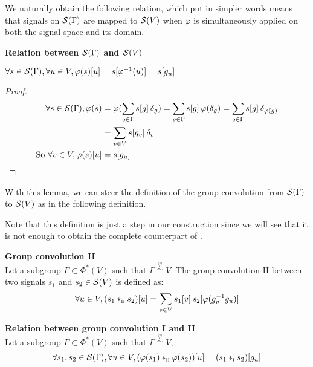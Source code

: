 We naturally obtain the following relation, which put in simpler words means that signals on $\cs(\Gamma)$ are mapped to $\cs(V)$ when $\varphi$ is simultaneously applied on both the signal space and its domain.

\begin{lemma}\textbf{Relation between $\cs(\Gamma)$ and $\cs(V)$}\\
\centerline{$\forall s \in \cs(\Gamma), \forall u \in V, \varphi(s)[u] = s[\varphi^{-1}(u)] = s[g_u]$}
\label{lem:outer}
\end{lemma}

\begin{proof}
\begin{align*}
\forall s \in \cs(\Gamma), \varphi(s) & = \varphi(\displaystyle \sum_{g \in \Gamma} s[g] \h{2} \delta_g)
 = \displaystyle \sum_{g \in \Gamma} s[g] \h{2} \varphi(\delta_g)
 = \displaystyle \sum_{g \in \Gamma} s[g] \h{2} \delta_{\varphi(g)}\\
 & = \displaystyle \sum_{v \in V} s[g_v] \h{2} \delta_v\\
 \text{So }\forall v \in V, \varphi(s) [u] & = s[g_u]
\end{align*}
\end{proof}

With this lemma, we can steer the definition of the group convolution from $\cs(\Gamma)$ to $\cs(V)$ as in the following definition.

\begin{remark}
Note that this definition is just a step in our construction since we will see that it is not enough to obtain the complete counterpart of .
\end{remark}

\begin{definition}\textbf{Group convolution II}\\
Let a subgroup $\Gamma \subset \Phi^*(V)$ such that $\Gamma \overset{\varphi}{\cong} V$.
The group convolution II between two signals $s_1$ and $s_2 \in \cs(V)$ is defined as:
\begin{gather*}
\forall u \in V, (s_1 \ast_{\II} s_2) [u] = \displaystyle \sum_{v \in V} s_1[v] \h{2} s_2[\varphi(g_v^{-1}g_u)]
\end{gather*}
\label{def:conv2}
\end{definition}

\begin{lemma}\textbf{Relation between group convolution I and II}\\
Let a subgroup $\Gamma \subset \Phi^*(V)$ such that $\Gamma \overset{\varphi}{\cong} V$,
\begin{gather*}
\forall s_1, s_2 \in \cs(\Gamma), \forall u \in V,
(\varphi(s_1) \ast_{\II} \varphi(s_2))[u] = (s_1 \ast_{\I} s_2)[g_u]
\end{gather*}
\label{lem:rel12}
\end{lemma}

